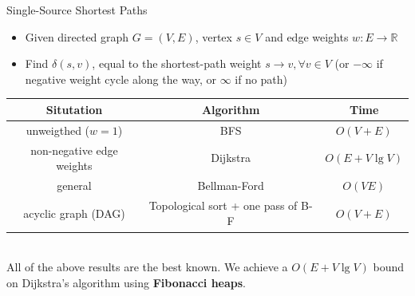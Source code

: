 \documentclass[aspectratio=169]{beamer}
\begin{document}
\begin{frame}{Single-Source Shortest Paths}
    \begin{itemize}
        \item Given directed graph $G = (V, E)$, vertex $s \in V$ and edge weights $w : E \rightarrow \mathbb{R}$
        \item Find $\delta(s, v)$, equal to the shortest-path weight $s \rightarrow v, \forall v \in V$ (or $-\infty$ if negative weight cycle along the way, or $\infty$ if no path)
    \end{itemize} \pause
    \bigskip
    \scriptsize
    \centering
    \begin{tabular}{ c | c | c}
        \textbf{Situtation}         & \textbf{Algorithm}                    & \textbf{Time} \\ \hline
        unweigthed ($w = 1$)        & BFS                                   & \pause $O(V + E)$    \\
        non-negative edge weights   & Dijkstra                              & \pause $O(E + V \lg V)$\\
        general                     & Bellman-Ford                          & \pause $O(VE)$       \\
        acyclic graph (DAG)         & Topological sort + one pass of B-F    & \pause $O(V + E)$    \\
    \end{tabular}\\
    \bigskip
    All of the above results are the best known. We achieve a $O(E + V \lg V )$ bound on Dijkstra’s algorithm using \textbf{Fibonacci heaps}.
\end{frame}
\end{document}
